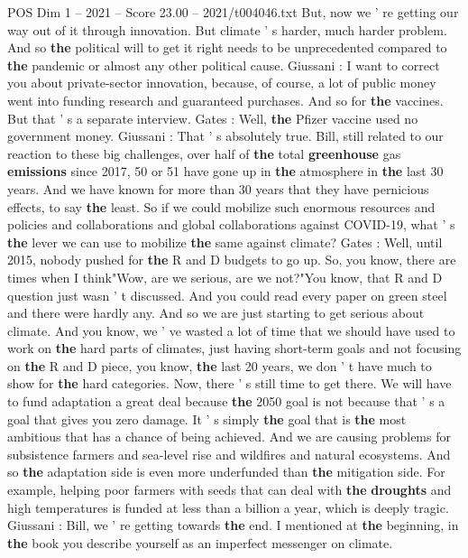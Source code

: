 \begin{textsample}{POS Dim 1 – 2021 – Score 23.00 – 2021/t004046.txt}
But, now we ' re getting our way out of it through innovation.
But climate ' s harder, much harder problem.
And so \textbf{the} political will to get it right needs to be unprecedented compared to \textbf{the} pandemic or almost any other political cause.
Giussani : I want to correct you about private-sector innovation, because, of course, a lot of public money went into funding research and guaranteed purchases.
And so for \textbf{the} vaccines.
But that ' s a separate interview.
Gates : Well, \textbf{the} Pfizer vaccine used no government money.
Giussani : That ' s absolutely true.
Bill, still related to our reaction to these big challenges, over half of \textbf{the} total \textbf{greenhouse} gas \textbf{emissions} since 2017, 50 or 51 have gone up in \textbf{the} atmosphere in \textbf{the} last 30 years.
And we have known for more than 30 years that they have pernicious effects, to say \textbf{the} least.
So if we could mobilize such enormous resources and policies and collaborations and global collaborations against COVID-19, what ' s \textbf{the} lever we can use to mobilize \textbf{the} same against climate?
Gates : Well, until 2015, nobody pushed for \textbf{the} R and D budgets to go up.
So, you know, there are times when I think"Wow, are we serious, are we not?"You know, that R and D question just wasn ' t discussed.
And you could read every paper on green steel and there were hardly any.
And so we are just starting to get serious about climate.
And you know, we ' ve wasted a lot of time that we should have used to work on \textbf{the} hard parts of climates, just having short-term goals and not focusing on \textbf{the} R and D piece, you know, \textbf{the} last 20 years, we don ' t have much to show for \textbf{the} hard categories.
Now, there ' s still time to get there.
We will have to fund adaptation a great deal because \textbf{the} 2050 goal is not because that ' s a goal that gives you zero damage.
It ' s simply \textbf{the} goal that is \textbf{the} most ambitious that has a chance of being achieved.
And we are causing problems for subsistence farmers and sea-level rise and wildfires and natural ecosystems.
And so \textbf{the} adaptation side is even more underfunded than \textbf{the} mitigation side.
For example, helping poor farmers with seeds that can deal with \textbf{the} \textbf{droughts} and high temperatures is funded at less than a billion a year, which is deeply tragic.
Giussani : Bill, we ' re getting towards \textbf{the} end.
I mentioned at \textbf{the} beginning, in \textbf{the} book you describe yourself as an imperfect messenger on climate.

\end{textsample}

